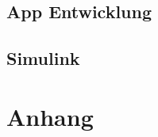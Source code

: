 \documentclass[a4paper,10pt,fleqn]{article}
\begin{document}
\subsection{App Entwicklung}
\label{sec:App entwicklung}




\subsection{Simulink}
\label{sec:Simulink}









%


\section{Anhang}
\label{sec:Anhang}
\appendix

\nocite{*}
  
  \clearpage





\end{document}
